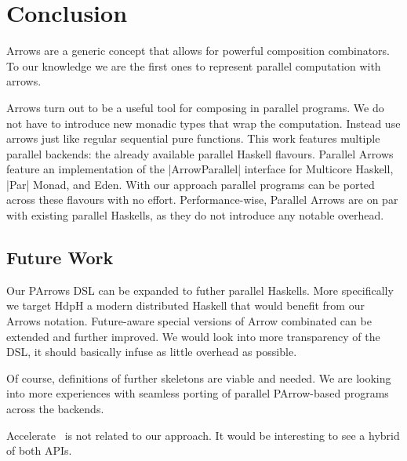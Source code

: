 
\section{Conclusion}
\label{sec:conclusion}
Arrows are a generic concept that allows for powerful composition combinators. To our knowledge we are the first ones to represent parallel computation with arrows. \done

Arrows turn out to be a useful tool for composing in parallel programs. We do not have to introduce new monadic types that wrap the computation. Instead use arrows just like regular sequential pure functions. 
%
This work features multiple parallel backends: the already available parallel Haskell flavours. Parallel Arrows feature an implementation of the |ArrowParallel| interface for Multicore Haskell, |Par| Monad, and Eden. With our approach parallel programs can be ported across these flavours with no effort.
%
%
Performance-wise, Parallel Arrows are on par with existing parallel Haskells, as they do not introduce any notable overhead.





\subsection{Future Work}
\label{sec:future-work}

Our PArrows DSL can be expanded to futher parallel Haskells. More specifically we target HdpH \cite{Maier:2014:HDS:2775050.2633363} a modern distributed Haskell that would benefit from our Arrows notation. Future-aware special versions of Arrow combinated can be extended and further improved. We would look into more transparency of the DSL, it should basically infuse as little overhead as possible.

Of course, definitions of further skeletons are viable and needed. We are looking into more experiences with seamless porting of parallel PArrow-based programs across the backends.

Accelerate~\cite{Chakravarty:2011:AHA:1926354.1926358} is not related to our approach. It would be interesting to see a hybrid of both APIs.

